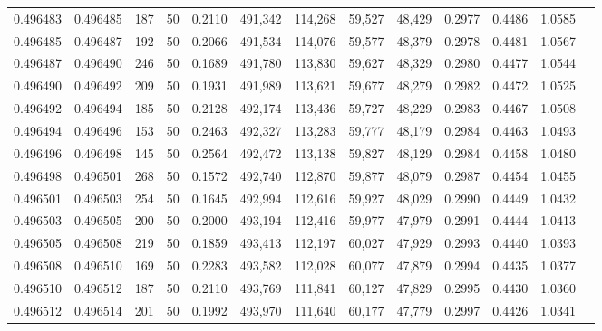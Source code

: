 \begin{tabular}{rrrrrrrrrrrrr}
0.496483 & 0.496485 &   187 &  50 &                                     0.2110 & 491,342 & 114,268 &  59,527 &  48,429 & 0.2977 & 0.4486 & 1.0585 \\
0.496485 & 0.496487 &   192 &  50 &                                     0.2066 & 491,534 & 114,076 &  59,577 &  48,379 & 0.2978 & 0.4481 & 1.0567 \\
0.496487 & 0.496490 &   246 &  50 &                                     0.1689 & 491,780 & 113,830 &  59,627 &  48,329 & 0.2980 & 0.4477 & 1.0544 \\
0.496490 & 0.496492 &   209 &  50 &                                     0.1931 & 491,989 & 113,621 &  59,677 &  48,279 & 0.2982 & 0.4472 & 1.0525 \\
0.496492 & 0.496494 &   185 &  50 &                                     0.2128 & 492,174 & 113,436 &  59,727 &  48,229 & 0.2983 & 0.4467 & 1.0508 \\
0.496494 & 0.496496 &   153 &  50 &                                     0.2463 & 492,327 & 113,283 &  59,777 &  48,179 & 0.2984 & 0.4463 & 1.0493 \\
0.496496 & 0.496498 &   145 &  50 &                                     0.2564 & 492,472 & 113,138 &  59,827 &  48,129 & 0.2984 & 0.4458 & 1.0480 \\
0.496498 & 0.496501 &   268 &  50 &                                     0.1572 & 492,740 & 112,870 &  59,877 &  48,079 & 0.2987 & 0.4454 & 1.0455 \\
0.496501 & 0.496503 &   254 &  50 &                                     0.1645 & 492,994 & 112,616 &  59,927 &  48,029 & 0.2990 & 0.4449 & 1.0432 \\
0.496503 & 0.496505 &   200 &  50 &                                     0.2000 & 493,194 & 112,416 &  59,977 &  47,979 & 0.2991 & 0.4444 & 1.0413 \\
0.496505 & 0.496508 &   219 &  50 &                                     0.1859 & 493,413 & 112,197 &  60,027 &  47,929 & 0.2993 & 0.4440 & 1.0393 \\
0.496508 & 0.496510 &   169 &  50 &                                     0.2283 & 493,582 & 112,028 &  60,077 &  47,879 & 0.2994 & 0.4435 & 1.0377 \\
0.496510 & 0.496512 &   187 &  50 &                                     0.2110 & 493,769 & 111,841 &  60,127 &  47,829 & 0.2995 & 0.4430 & 1.0360 \\
0.496512 & 0.496514 &   201 &  50 &                                     0.1992 & 493,970 & 111,640 &  60,177 &  47,779 & 0.2997 & 0.4426 & 1.0341 \\

\end{tabular}
